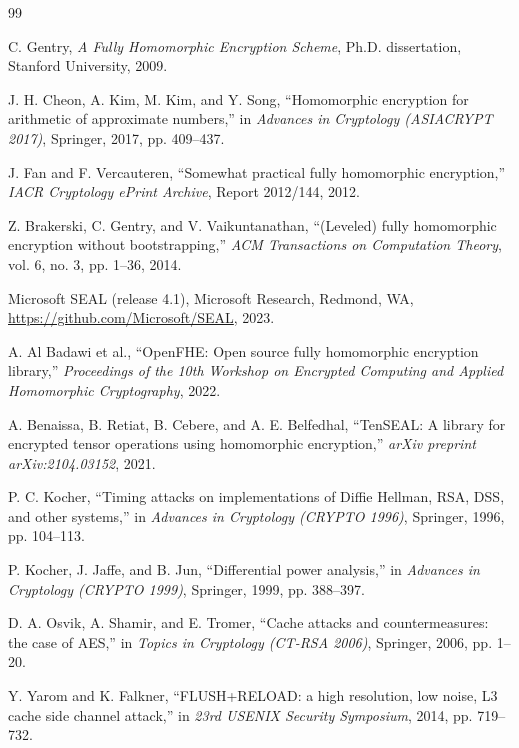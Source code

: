 \documentclass[12pt,a4paper]{article}
\begin{document}
\begin{thebibliography}{99}

C. Gentry,
\textit{A Fully Homomorphic Encryption Scheme},
Ph.D. dissertation, Stanford University, 2009.

J. H. Cheon, A. Kim, M. Kim, and Y. Song,
``Homomorphic encryption for arithmetic of approximate numbers,''
in \textit{Advances in Cryptology (ASIACRYPT 2017)},
Springer, 2017, pp. 409--437.

J. Fan and F. Vercauteren,
``Somewhat practical fully homomorphic encryption,''
\textit{IACR Cryptology ePrint Archive}, Report 2012/144, 2012.

Z. Brakerski, C. Gentry, and V. Vaikuntanathan,
``(Leveled) fully homomorphic encryption without bootstrapping,''
\textit{ACM Transactions on Computation Theory}, vol. 6, no. 3, pp. 1--36, 2014.

Microsoft SEAL (release 4.1),
Microsoft Research, Redmond, WA,
\url{https://github.com/Microsoft/SEAL}, 2023.

A. Al Badawi et al.,
``OpenFHE: Open source fully homomorphic encryption library,''
\textit{Proceedings of the 10th Workshop on Encrypted Computing and Applied Homomorphic Cryptography}, 2022.

A. Benaissa, B. Retiat, B. Cebere, and A. E. Belfedhal,
``TenSEAL: A library for encrypted tensor operations using homomorphic encryption,''
\textit{arXiv preprint arXiv:2104.03152}, 2021.

P. C. Kocher,
``Timing attacks on implementations of Diffie Hellman, RSA, DSS, and other systems,''
in \textit{Advances in Cryptology (CRYPTO 1996)},
Springer, 1996, pp. 104--113.

P. Kocher, J. Jaffe, and B. Jun,
``Differential power analysis,''
in \textit{Advances in Cryptology (CRYPTO 1999)},
Springer, 1999, pp. 388--397.

D. A. Osvik, A. Shamir, and E. Tromer,
``Cache attacks and countermeasures: the case of AES,''
in \textit{Topics in Cryptology (CT-RSA 2006)},
Springer, 2006, pp. 1--20.

Y. Yarom and K. Falkner,
``FLUSH+RELOAD: a high resolution, low noise, L3 cache side channel attack,''
in \textit{23rd USENIX Security Symposium}, 2014, pp. 719--732.


\end{thebibliography}
\end{document}
